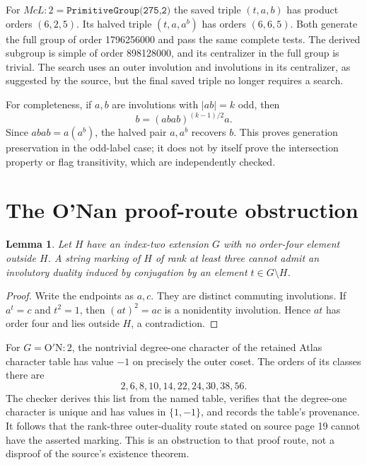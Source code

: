 \documentclass[11pt]{article}
\newtheorem{lemma}{Lemma}
\newcommand{\ON}{\mathrm{O'N}}
\begin{document}
For $McL:2=\texttt{PrimitiveGroup(275,2)}$ the saved triple $(t,a,b)$ has product orders $(6,2,5)$. Its halved triple $(t,a,a^b)$ has orders $(6,6,5)$. Both generate the full group of order 1796256000 and pass the same complete tests. The derived subgroup is simple of order 898128000, and its centralizer in the full group is trivial. The search uses an outer involution and involutions in its centralizer, as suggested by the source, but the final saved triple no longer requires a search.

For completeness, if $a,b$ are involutions with $|ab|=k$ odd, then
\[
 b=(abab)^{(k-1)/2}a.
\]
Since $abab=a(a^b)$, the halved pair $a,a^b$ recovers $b$. This proves generation preservation in the odd-label case; it does not by itself prove the intersection property or flag transitivity, which are independently checked.
\section{The O'Nan proof-route obstruction}
\begin{lemma}
Let $H$ have an index-two extension $G$ with no order-four element outside $H$. A string marking of $H$ of rank at least three cannot admit an involutory duality induced by conjugation by an element $t\in G\setminus H$.
\end{lemma}
\begin{proof}
Write the endpoints as $a,c$. They are distinct commuting involutions. If $a^t=c$ and $t^2=1$, then $(at)^2=ac$ is a nonidentity involution. Hence $at$ has order four and lies outside $H$, a contradiction.
\end{proof}
For $G=\ON:2$, the nontrivial degree-one character of the retained Atlas character table has value $-1$ on precisely the outer coset. The orders of its classes there are
\[
 2,6,8,10,14,22,24,30,38,56.
\]
The checker derives this list from the named table, verifies that the degree-one character is unique and has values in $\{1,-1\}$, and records the table's provenance. It follows that the rank-three outer-duality route stated on source page 19 cannot have the asserted marking. This is an obstruction to that proof route, not a disproof of the source's existence theorem.
\end{document}

